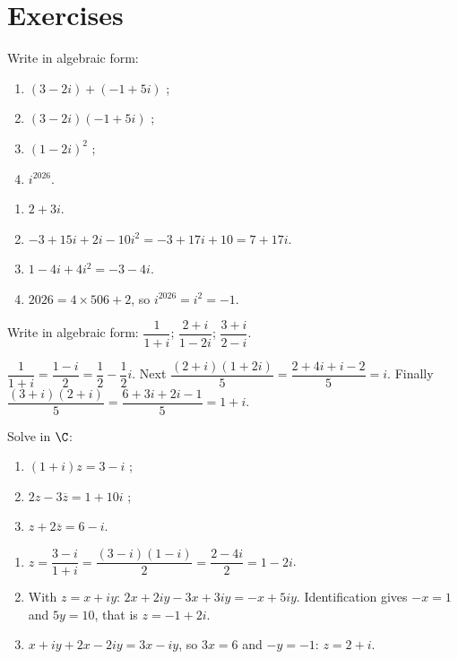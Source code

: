 \mxnewpage
\section{Exercises}
\begin{exercise}
Write in algebraic form:
\begin{enumerate}
\item $(3-2i)+(-1+5i)$ ;
\item $(3-2i)(-1+5i)$ ;
\item $(1-2i)^2$ ;
\item $i^{2026}$.
\end{enumerate}
\end{exercise}
\begin{solution}
\begin{enumerate}
\item $2+3i$.
\item $-3+15i+2i-10i^2=-3+17i+10=7+17i$.
\item $1-4i+4i^2=-3-4i$.
\item $\num{2026}=4\times506+2$, so $i^{2026}=i^2=-1$.
\end{enumerate}
\end{solution}

\begin{exercise}
Write in algebraic form: $\dfrac1{1+i}$; $\dfrac{2+i}{1-2i}$; $\dfrac{3+i}{2-i}$.
\end{exercise}
\begin{solution}
$\dfrac1{1+i}=\dfrac{1-i}{2}=\dfrac12-\dfrac12i$. Next $\dfrac{(2+i)(1+2i)}{5}=\dfrac{2+4i+i-2}{5}=i$. Finally $\dfrac{(3+i)(2+i)}{5}=\dfrac{6+3i+2i-1}{5}=1+i$.
\end{solution}

\begin{exercise}[Equations]
Solve in $\C$:
\begin{enumerate}
\item $(1+i)z=3-i$ ;
\item $2z-3\overline z=1+10i$ ;
\item $z+2\overline z=6-i$.
\end{enumerate}
\end{exercise}
\begin{solution}
\begin{enumerate}
\item $z=\dfrac{3-i}{1+i}=\dfrac{(3-i)(1-i)}{2}=\dfrac{2-4i}{2}=1-2i$.
\item With $z=x+iy$: $2x+2iy-3x+3iy=-x+5iy$. Identification gives $-x=1$ and $5y=10$, that is $z=-1+2i$.
\item $x+iy+2x-2iy=3x-iy$, so $3x=6$ and $-y=-1$: $z=2+i$.
\end{enumerate}
\end{solution}

